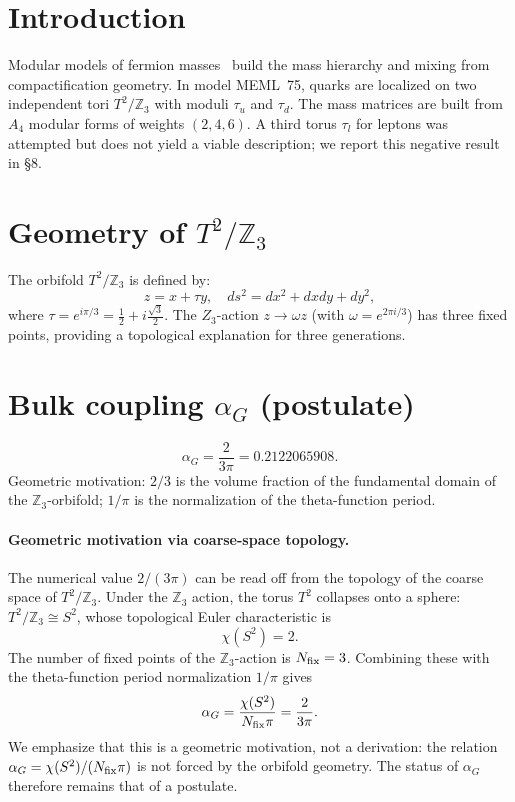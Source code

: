 \documentclass[12pt,a4paper]{article}
\numberwithin{equation}{section}
\begin{document}
\newpage

\section{Introduction}
Modular models of fermion masses~\cite{Feruglio2017,Kobayashi2019} build the mass hierarchy and mixing from compactification geometry. In model MEML~75, quarks are localized on two independent tori \(T^2/\mathbb{Z}_3\) with moduli \(\tau_u\) and \(\tau_d\). The mass matrices are built from \(A_4\) modular forms of weights \((2,4,6)\). A third torus \(\tau_l\) for leptons was attempted but does not yield a viable description; we report this negative result in \S8.

\section{Geometry of \(T^2/\mathbb{Z}_3\)}
The orbifold \(T^2/\mathbb{Z}_3\) is defined by:
\begin{equation}
z = x + \tau y,\quad ds^2 = dx^2 +dxdy + dy^2,
\end{equation}
where \(\tau = e^{i\pi/3} = \frac{1}{2} +i\frac{\sqrt{3}}{2}\). The \(Z_3\)-action \(z\to \omega z\) (with \(\omega = e^{2\pi i/3}\)) has three fixed points, providing a topological explanation for three generations.

\section{Bulk coupling \(\alpha_G\) (postulate)}
\begin{equation}
\alpha_G = \frac{2}{3\pi} = 0.2122065908.
\end{equation}
Geometric motivation: \(2/3\) is the volume fraction of the fundamental domain of the \(\mathbb{Z}_3\)-orbifold; \(1/\pi\) is the normalization of the theta-function period.

\paragraph{Geometric motivation via coarse-space topology.}
The numerical value \(2/(3\pi)\) can be read off from the topology of the coarse space of \(T^2/\mathbb{Z}_3\). Under the \(\mathbb{Z}_3\) action, the torus \(T^2\) collapses onto a sphere: \(T^2/\mathbb{Z}_3\cong S^2\), whose topological Euler characteristic is
\begin{equation}
\chi(S^2) = 2.
\end{equation}
The number of fixed points of the \(\mathbb{Z}_3\)-action is \(N_{\rm fix} = 3\). Combining these with the theta-function period normalization \(1/\pi\) gives
\begin{equation}
\alpha_G = \frac{\chi(S^2)}{N_{\rm fix}\pi} = \frac{2}{3\pi}.
\end{equation}
We emphasize that this is a geometric motivation, not a derivation: the relation \(\alpha_G = \chi(S^2)/(N_{\rm fix}\pi)\) is not forced by the orbifold geometry. The status of \(\alpha_G\) therefore remains that of a postulate.
\end{document}
